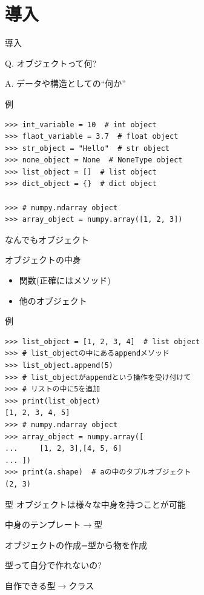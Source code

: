 \documentclass[12pt, xetex, xcolor=pdftex, dvipsnames]{beamer}
\begin{document}
\section{導入}
\begin{frame}{導入}
    \begin{block}{Q.}
        {\Large オブジェクトって何?}
    \end{block}
    \pause
    \begin{alertblock}{A.}
        データや構造としての{\Large ``何か''}
    \end{alertblock}
\end{frame}
\begin{frame}[fragile]{例}
\begin{lstlisting}
>>> int_variable = 10  # int object
>>> flaot_variable = 3.7  # float object
>>> str_object = "Hello"  # str object
>>> none_object = None  # NoneType object
>>> list_object = []  # list object
>>> dict_object = {}  # dict object

>>> # numpy.ndarray object
>>> array_object = numpy.array([1, 2, 3])
\end{lstlisting}
\pause
なんでもオブジェクト
\end{frame}
\begin{frame}{オブジェクトの中身}
\begin{itemize}
    \item 関数(正確にはメソッド)
    \item 他のオブジェクト
\end{itemize}
\end{frame}
\begin{frame}[fragile]{例}
\begin{lstlisting}
>>> list_object = [1, 2, 3, 4]  # list object
>>> # list_objectの中にあるappendメソッド
>>> list_object.append(5)
>>> # list_objectがappendという操作を受け付けて
>>> # リストの中に5を追加
>>> print(list_object)
[1, 2, 3, 4, 5]
>>> # numpy.ndarray object
>>> array_object = numpy.array([
...     [1, 2, 3],[4, 5, 6]
... ])
>>> print(a.shape)  # aの中のタプルオブジェクト
(2, 3)
\end{lstlisting}
\end{frame}
\begin{frame}{型}
    オブジェクトは様々な中身を持つことが可能

    中身のテンプレート$\rightarrow$型
\end{frame}
{
    \begin{frame}{オブジェクトの作成=型から物を作成}
    \end{frame}
}
\begin{frame}
    型って自分で作れないの?

    \pause
    自作できる型$\rightarrow$クラス
\end{frame}
\end{document}
